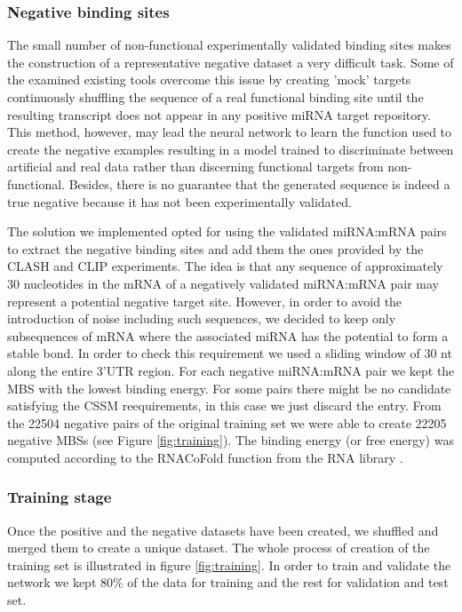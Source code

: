 \subsubsection{Negative binding sites}
The small number of non-functional experimentally validated binding sites makes 
the construction of a representative negative dataset a very difficult task. Some of the examined existing tools overcome this issue by creating 'mock' targets \cite{mirmark} continuously shuffling the sequence of a real functional binding site until the resulting transcript does not appear in any positive miRNA target repository. This method, however, may lead the neural network to learn the function used to create the negative examples resulting in a model trained to discriminate between artificial and real data rather than discerning functional targets from non-functional. Besides, there is no guarantee that the generated sequence is indeed a true negative because it has not been experimentally validated.

The solution we implemented opted for using the validated miRNA:mRNA pairs to extract the negative binding sites and add them the ones provided by the CLASH and CLIP experiments. The idea is that any sequence of approximately 30 nucleotides in the mRNA of a negatively validated miRNA:mRNA pair may represent a potential negative target site. However, in order to avoid the introduction of noise including such sequences, we decided to keep only subsequences of mRNA where the associated miRNA has the potential to form a stable bond. In order to check this requirement we used a sliding window of 30 nt along the entire 3'UTR region. For each negative miRNA:mRNA pair we kept the  MBS with the lowest binding energy. For some pairs there might be no candidate satisfying the CSSM reequirements, in this case we just discard the entry. From the 22504 negative pairs of the original training set we were able to create 22205 negative MBSs (see Figure \ref{fig:training}). The binding energy (or free energy) was  computed according to the RNACoFold function from the RNA library \cite{vienna_rna}. 

\subsubsection{Training stage}
Once the positive and the negative datasets have been created, we shuffled and merged them to create a unique dataset. The whole process of creation of the training set is illustrated in figure \ref{fig:training}. In order to train and validate the network we kept 80\% of the data for training and the rest for validation and test set. 

